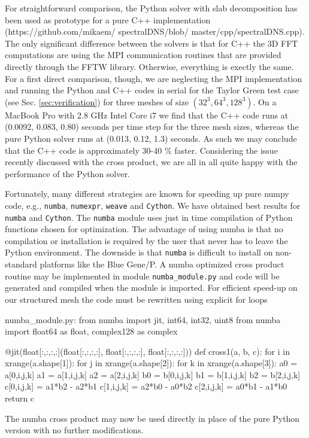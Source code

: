 \documentclass[11pt, oneside]{article}
\newcommand{\inpyth}{\lstinline[style=pythonstyle, basicstyle=\ttfamily]} %[]%
\begin{document}
For straightforward comparison, the Python solver with slab decomposition has been used as prototype for a 
pure C++ implementation (https://github.com/mikaem/ spectralDNS/blob/ master/cpp/spectralDNS.cpp). The 
only significant difference between the solvers is that for C++ the 3D FFT computations are using the MPI communication routines that are provided directly through the FFTW library. Otherwise, everything is exectly the same. For a first direct comparison, though, we are neglecting the MPI implementation and running the Python and C++ codes in serial for the Taylor Green test case (see Sec. \ref{sec:verification}) for three meshes of size $(32^3, 64^3, 128^3)$. On a 
MacBook Pro with 2.8 GHz Intel Core i7 we find that the C++ code runs at (0.0092, 0.083, 0.80) seconds per time step for the three mesh sizes, whereas the pure Python solver runs at (0.013, 0.12, 1.3) seconds. As such we may conclude that the C++ code is approximately 30-40 \% faster. Considering the issue recently 
discussed with the cross product, we are all in all quite happy with the performance of the Python solver.  

Fortunately, many different strategies are known for speeding up pure numpy code, e.g.,  \inpyth{numba}, \inpyth{numexpr}, \inpyth{weave} and \inpyth{Cython}. We have obtained best results for \inpyth{numba} and \inpyth{Cython}. The \inpyth{numba} module uses just in time compilation of Python functions chosen for optimization. The advantage of using numba is that no compilation or installation is required by the user that never has to leave the Python environment. The downside is that \inpyth{numba} is difficult to install on non-standard platforms like the Blue Gene/P. A numba optimized cross product routine may be implemented in module \inpyth{numba_module.py} and code will be generated and compiled when the module is imported.  For efficient speed-up on our structured mesh the code must be rewritten using explicit for loops
\begin{python}
numba_module.py:
from numba import jit, int64, int32, uint8
from numba import float64 as float, complex128 as complex

@jit(float[:,:,:,:](float[:,:,:,:], float[:,:,:,:], float[:,:,:,:]))
def cross1(a, b, c):
    for i in xrange(a.shape[1]):
        for j in xrange(a.shape[2]):
            for k in xrange(a.shape[3]):
                a0 = a[0,i,j,k]
                a1 = a[1,i,j,k]
                a2 = a[2,i,j,k]
                b0 = b[0,i,j,k]
                b1 = b[1,i,j,k]
                b2 = b[2,i,j,k]
                c[0,i,j,k] = a1*b2 - a2*b1
                c[1,i,j,k] = a2*b0 - a0*b2
                c[2,i,j,k] = a0*b1 - a1*b0
    return c
\end{python}
The numba cross product may now be used directly in place of the pure Python version with no further modifications.
\end{document}
